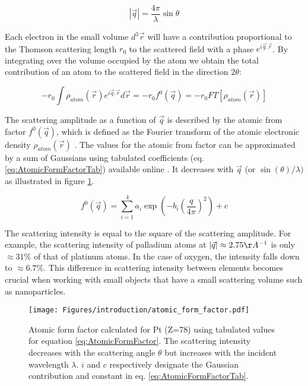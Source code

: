 \begin{equation}
    \label{eq:QSinTheta}
    |\vec{q}| = \frac{4\pi}{\lambda} \sin{\theta}
\end{equation}

Each electron in the small volume $d^3\vec{r}$ will have a contribution proportional to the Thomson scattering length $r_0$ to the scattered field with a phase $e^{i\vec{q}.\vec{r}}$.
By integrating over the volume occupied by the atom we obtain the total contribution of an atom to the scattered field in the direction $2\theta$:

\begin{equation}
    \label{eq:AtomicFormFactor}
    -r_0 \int \rho_{atom} (\vec{r}) e^{i\vec{q}.\vec{r}} d\vec{r} = -r_0 f^0(\vec{q}) = -r_0 FT [\rho_{atom} (\vec{r})]
\end{equation}

The scattering amplitude as a function of $\vec{q}$ is described by the atomic from factor $f^0(\vec{q})$, which is defined as the Fourier transform of the atomic electronic density $\rho_{atom}(\vec{r})$ \parencite{Paganin}.
The values for the atomic from factor can be approximated by a sum of Gaussians using tabulated coefficients (eq. \ref{eq:AtomicFormFactorTab}) available online \parencite{InterTablesOfCryst}.
It decreases with $\vec{q}$ (or $\sin(\theta) / \lambda)$ as illustrated in figure \ref{fig:atomic_form_factor}.

\begin{equation}
    \label{eq:AtomicFormFactorTab}
    f^0(\vec{q}) = \sum_{i=1}^4 a_i \exp (-b_i (\frac{q} {4\pi})^2) + c
\end{equation}

The scattering intensity is equal to the square of the scattering amplitude.
For example, the scattering intensity of palladium atoms at $|\vec{q}| \approx 2.75 \AA^{-1}$ is only $\approx 31\%$ of that of platinum atoms. In the case of oxygen, the intensity falls down to $\approx 6.7\%$.
This difference in scattering intensity between elements becomes crucial when working with small objects that have a small scattering volume such as nanoparticles.

\begin{figure}[!htb]
    \centering
    \texttt{[image: Figures/introduction/atomic\_form\_factor.pdf]}
    \caption{
    Atomic form factor calculated for Pt (Z=78) using tabulated values \parencite{InterTablesOfCryst} for equation \ref{eq:AtomicFormFactor}. The scattering intensity decreases with the scattering angle $\theta$ but increases with the incident wavelength $\lambda$. $i$ and $c$ respectively designate the Gaussian contribution and constant in eq. \ref{eq:AtomicFormFactorTab}.
    }
    \label{fig:atomic_form_factor}
\end{figure}

